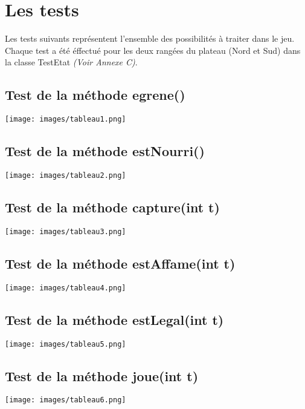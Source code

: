 \documentclass[11pt,a4paper]{report}
\begin{document}
\chapter{Les tests}

    \begin{flushleft}
    Les tests suivants représentent l'ensemble des possibilités à traiter dans le jeu. Chaque test a été éffectué pour les deux rangées du plateau (Nord et Sud) dans la classe TestEtat \textit{(Voir Annexe C)}.
    \end{flushleft}

    \section{Test de la méthode egrene()}

        \texttt{[image: images/tableau1.png]}

    \section{Test de la méthode estNourri()}

        \texttt{[image: images/tableau2.png]}

    \section{Test de la méthode capture(int t)}

        \texttt{[image: images/tableau3.png]}

    \section{Test de la méthode estAffame(int t)}

        \texttt{[image: images/tableau4.png]}

    \section{Test de la méthode estLegal(int t)}

        \texttt{[image: images/tableau5.png]}

    \section{Test de la méthode joue(int t)}

        \texttt{[image: images/tableau6.png]}
\end{document}
